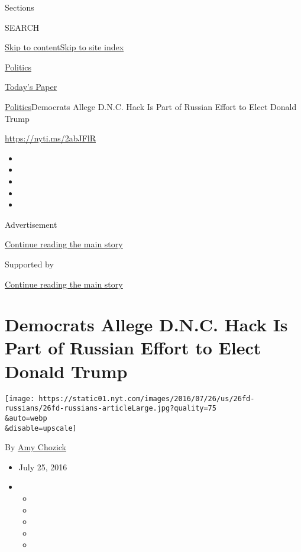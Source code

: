 Sections

SEARCH

\protect\hyperlink{site-content}{Skip to
content}\protect\hyperlink{site-index}{Skip to site index}

\href{https://www.nytimes.com/section/politics}{Politics}

\href{https://myaccount.nytimes.com/auth/login?response_type=cookie\&client_id=vi}{}

\href{https://www.nytimes.com/section/todayspaper}{Today's Paper}

\href{/section/politics}{Politics}\textbar{}Democrats Allege D.N.C. Hack
Is Part of Russian Effort to Elect Donald Trump

\url{https://nyti.ms/2abJFlR}

\begin{itemize}
\item
\item
\item
\item
\item
\end{itemize}

Advertisement

\protect\hyperlink{after-top}{Continue reading the main story}

Supported by

\protect\hyperlink{after-sponsor}{Continue reading the main story}

\hypertarget{democrats-allege-dnc-hack-is-part-of-russian-effort-to-elect-donald-trump}{%
\section{Democrats Allege D.N.C. Hack Is Part of Russian Effort to Elect
Donald
Trump}\label{democrats-allege-dnc-hack-is-part-of-russian-effort-to-elect-donald-trump}}

\texttt{[image: https://static01.nyt.com/images/2016/07/26/us/26fd-russians/26fd-russians-articleLarge.jpg?quality=75\\\&auto=webp\\\&disable=upscale]}

By \href{http://www.nytimes.com/by/amy-chozick}{Amy Chozick}

\begin{itemize}
\item
  July 25, 2016
\item
  \begin{itemize}
  \item
  \item
  \item
  \item
  \item
  \end{itemize}
\end{itemize}

